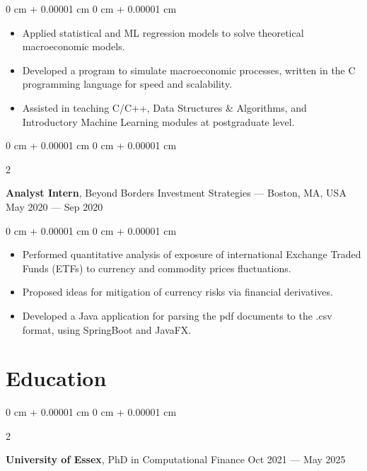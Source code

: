 \documentclass[10pt, letterpaper]{article}
\newenvironment{highlights}{
    \begin{itemize}[
        topsep=0.10 cm,
        parsep=0.10 cm,
        partopsep=0pt,
        itemsep=0pt,
        leftmargin=0 cm + 10pt
    ]
}{
    \end{itemize}
} %
\newenvironment{onecolentry}{
    \begin{adjustwidth}{
        0 cm + 0.00001 cm
    }{
        0 cm + 0.00001 cm
    }
}{
    \end{adjustwidth}
} %
\newenvironment{twocolentry}[2][]{
    \onecolentry
    \def\secondColumn{#2}
    \setcolumnwidth{\fill, 4.5 cm}
    \begin{paracol}{2}
}{
    \switchcolumn \raggedleft \secondColumn
    \end{paracol}
    \endonecolentry
} %
\begin{document}
        \vspace{0.10 cm}
        \begin{onecolentry}
            \begin{highlights}
            \item Applied statistical and ML regression models to solve theoretical macroeconomic models.
                  \item Developed a program to simulate macroeconomic processes, written in the C programming language for speed and scalability.
                  \item Assisted in teaching C/C++, Data Structures \& Algorithms, and Introductory Machine Learning modules at postgraduate level.
            \end{highlights}
        \end{onecolentry}
    
        \vspace{0.2 cm}

        \begin{twocolentry}{
            May 2020 --- Sep 2020
        }
            \textbf{Analyst Intern}, Beyond Borders Investment Strategies --- Boston, MA, USA\end{twocolentry}

            \vspace{0.10 cm}
            \begin{onecolentry}
                \begin{highlights}
                \item Performed quantitative analysis of exposure of international Exchange Traded Funds (ETFs) to currency and commodity prices fluctuations.
                \item Proposed ideas for mitigation of currency risks via financial derivatives.
                \item Developed a Java application for parsing the pdf documents to the .csv format, using SpringBoot and JavaFX.
                \end{highlights}
            \end{onecolentry}


    \section{Education}

        \begin{twocolentry}{
            Oct 2021 --- May 2025
        }
        \textbf{University of Essex}, PhD in Computational Finance\end{twocolentry}
\end{document}
